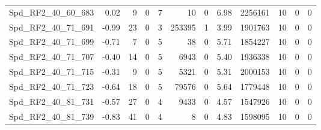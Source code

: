 \begin{longtable}[c]{@{}lrrrrrrrrrrr@{}}
Spd\_RF2\_40\_60\_683         & 0.02                   & 9                       & 0                       & 7                      & 10                      & 0                       & 6.98                    & 2256161                  & 10                       & 0                        & 0                        \\
Spd\_RF2\_40\_71\_691         & -0.99                  & 23                      & 0                       & 3                      & 253395                  & 1                       & 3.99                    & 1901763                  & 10                       & 0                        & 0                        \\
Spd\_RF2\_40\_71\_699         & -0.71                  & 7                       & 0                       & 5                      & 38                      & 0                       & 5.71                    & 1854227                  & 10                       & 0                        & 0                        \\
Spd\_RF2\_40\_71\_707         & -0.40                  & 14                      & 0                       & 5                      & 6943                    & 0                       & 5.40                    & 1936338                  & 10                       & 0                        & 0                        \\
Spd\_RF2\_40\_71\_715         & -0.31                  & 9                       & 0                       & 5                      & 5321                    & 0                       & 5.31                    & 2000153                  & 10                       & 0                        & 0                        \\
Spd\_RF2\_40\_71\_723         & -0.64                  & 18                      & 0                       & 5                      & 79576                   & 0                       & 5.64                    & 1779448                  & 10                       & 0                        & 0                        \\
Spd\_RF2\_40\_81\_731         & -0.57                  & 27                      & 0                       & 4                      & 9433                    & 0                       & 4.57                    & 1547926                  & 10                       & 0                        & 0                        \\
Spd\_RF2\_40\_81\_739         & -0.83                  & 41                      & 0                       & 4                      & 8                       & 0                       & 4.83                    & 1598095                  & 10                       & 0                        & 0                        \\

\end{longtable}
